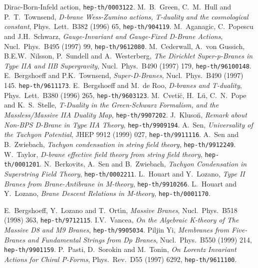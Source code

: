 \documentclass[12pt,a4paper]{article}
\begin{document}
\begin{thebibliography}{99}
{               Dirac-Born-Infeld action},
               {\tt hep-th/0003122}.
  M.~B.~Green, C.~M.~Hull and P.~T.~Townsend,
               {\it D-brane Wess-Zumino actions, T-duality and the
                 cosmological constant},
               Phys.~Lett.~B382 (1996) 65,
               {\tt hep-th/904119}.
  M.~Aganagic, C.~Popescu and J.H.~Schwarz,
               {\it Gauge-Invariant and Gauge-Fixed D-Brane Actions},
               Nucl.~Phys.~B495 (1997) 99,
               {\tt hep-th/9612080}.
  M.~Cederwall, A.~von Gussich, B.E.W.~Nilsson,
                P.~Sundell and A.~Westerberg,
               {\it The Dirichlet Super-p-Branes in Type IIA and IIB
                   Supergravity},
               Nucl.~Phys.~B490 (1997) 179,
               {\tt hep-th/96100148}.
   E.~Bergshoeff and P.K.~Townsend,
               {\it Super-D-Branes},
               Nucl.~Phys.~B490 (1997) 145.
               {\tt hep-th/9611173}.
  E.~Bergshoeff and M.~de Roo,
               {\it D-branes and T-duality},
               Phys.~Lett.~B380 (1996) 265,
               {\tt hep-th/9603123}.
 M.~Cveti\u c, H.~L\"u, C.~N.~Pope and K.~S.~Stelle,
               {\it T-Duality in the Green-Schwarz Formalism, and the
               Massless/Massive IIA Duality Map},
               {\tt hep-th/9907202}.
 J.~Kluso\u n,
               {\it Remark about Non-BPS D-Brane in Type IIA Theory},
               {\tt hep-th/9909194}.
 A.~Sen,
               {\it Universality of the Tachyon Potential},
               JHEP 9912 (1999) 027,
               {\tt hep-th/9911116}.
 A.~Sen and B.~Zwiebach,
               {\it Tachyon condensation in string field theory},
               {\tt hep-th/9912249}.
  W.~Taylor,
               {\it D-brane effective field theory from string field theory},
               {\tt hep-th/0001201}.
 N.~Berkovits, A.~Sen and B.~Zwiebach,
               {\it Tachyon Condensation in Superstring Field Theory},
               {\tt hep-th/0002211}.
  L.~Houart and Y.~Lozano,
               {\it Type II Branes from Brane-Antibrane in M-theory},
               {\tt hep-th/9910266}.
  L.~Houart and Y.~Lozano,
               {\it Brane Descent Relations in M-theory},
               {\tt hep-th/0001170}.

 E.~Bergshoeff, Y.~Lozano and T.~Ort\'\i n,
               {\it Massive Branes},
               Nucl.~Phys.~B518 (1998) 363,
               {\tt hep-th/9712115}.
 I.V.~Vancea,
               {\it On the Algebraic K-theory of The Massive D8 and M9 Branes},
               {\tt hep-th/9905034}.
   Piljin Yi,
               {\it Membranes from Five-Branes and Fundamental Strings from
                  Dp Branes},
               Nucl.~Phys.~B550 (1999) 214,
               {\tt hep-th/9901159}.
  P.~Pasti, D.~Sorokin and M.~Tonin,
               {\it On Lorentz Invariant Actions for Chiral P-Forms},
               Phys.~Rev.~D55 (1997) 6292,
               {\tt hep-th/9611100}.
\end{thebibliography}
\end{document}
